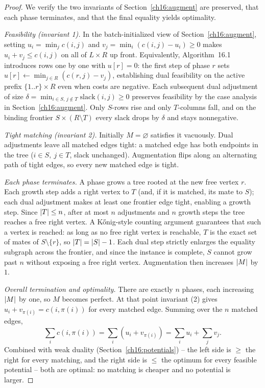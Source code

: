 \begin{proof}
We verify the two invariants of Section~\ref{ch16:augment} are preserved, that each phase terminates, and that the final equality yields optimality.

\emph{Feasibility (invariant 1).} In the batch-initialized view of Section~\ref{ch16:augment}, setting $u_i=\min_j c(i,j)$ and $v_j=\min_i (c(i,j)-u_i)\ge 0$ makes $u_i+v_j\le c(i,j)$ on all of $L\times R$ up front. Equivalently, Algorithm~16.1 introduces rows one by one with $u[r]=0$: the first step of phase $r$ sets $u[r]\gets \min_{j\in R}(c(r,j)-v_j)$, establishing dual feasibility on the active prefix $\{1..r\}\times R$ even when costs are negative. Each subsequent dual adjustment of size $\delta=\min_{i\in S,\,j\notin T}\mathrm{slack}(i,j)\ge 0$ preserves feasibility by the case analysis in Section~\ref{ch16:augment}. Only $S$-rows rise and only $T$-columns fall, and on the binding frontier $S\times(R\setminus T)$ every slack drops by $\delta$ and stays nonnegative.

\emph{Tight matching (invariant 2).} Initially $M=\varnothing$ satisfies it vacuously. Dual adjustments leave all matched edges tight: a matched edge has both endpoints in the tree ($i\in S,\ j\in T$, slack unchanged). Augmentation flips along an alternating path of tight edges, so every new matched edge is tight.

\emph{Each phase terminates.} A phase grows a tree rooted at the new free vertex $r$. Each growth step adds a right vertex to $T$ (and, if it is matched, its mate to $S$); each dual adjustment makes at least one frontier edge tight, enabling a growth step. Since $\lvert T\rvert\le n$, after at most $n$ adjustments and $n$ growth steps the tree reaches a free right vertex. A K\H{o}nig-style counting argument guarantees that such a vertex is reached: as long as no free right vertex is reachable, $T$ is the exact set of mates of $S\setminus\{r\}$, so $\lvert T\rvert=\lvert S\rvert-1$. Each dual step strictly enlarges the equality subgraph across the frontier, and since the instance is complete, $S$ cannot grow past $n$ without exposing a free right vertex. Augmentation then increases $\lvert M\rvert$ by $1$.

\emph{Overall termination and optimality.} There are exactly $n$ phases, each increasing $\lvert M\rvert$ by one, so $M$ becomes perfect. At that point invariant (2) gives $u_i+v_{\pi(i)}=c(i,\pi(i))$ for every matched edge. Summing over the $n$ matched edges,
\[
  \sum_i c(i,\pi(i)) = \sum_i (u_i+v_{\pi(i)}) = \sum_i u_i + \sum_j v_j.
\]
Combined with weak duality (Section~\ref{ch16:potentials}) -- the left side is $\ge$ the right for every matching, and the right side is $\le$ the optimum for every feasible potential -- both are optimal: no matching is cheaper and no potential is larger.
\end{proof}

